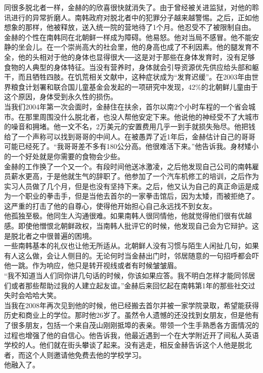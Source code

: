 同很多脱北者一样，金赫的的欣喜很快就消失了。由于曾经被关进监狱，对他的聆讯进行的异常折磨人。南韩政府对脱北者中的犯罪分子越来越警惕。之后，正如他想象的那样，他被释放，送入统一院的营地待了1个月。他忍受不了被限制自由。\\

金赫的个性在南韩同在北朝鲜一样成为障碍。他易怒。他对当局不感冒。他不能安静的坐会儿。在一个崇尚高大的社会里，他的身高也成了不利因素。他的腿发育不全，他的头相对于他的身体也显得很大──这是对于那些在身体发育时，没有足够食物的人典型的身体特征。当没有营养时，身体就会引导资源优先供应给头部和躯干，而且牺牲四肢。在饥荒相关文献中，这种症状成为“发育迟缓”。在2003年由世界粮食计划署和联合国儿童基金会发起的一项研究中发现，42\%的北朝鲜儿童由于这个原因，身体受到永久性的损伤。\\

当我们2004年第一次会面时，金赫住在扶余，首尔以南2个小时车程的一个省会城市。在那里周围没什么脱北者，也没人帮他安定下来。他说他的神经受不了大城市的噪音和拥堵。他一文不名，2万美元的安置费用几乎一到手就损失殆尽。他把钱给了一个声称可以找到哥哥的中间人。在被愚弄了近1年后，金赫估计自己的哥哥可能已经死了。“我哥哥差不多有180公分高。他很难活下来。”他告诉我。身材矮小的一个好处就是你需要的食物会少些。\\

金赫的工作换了一个又一个。有段时间他送冰激凌，之后他发现自己公司的南韩雇员薪水更高，于是他就生气的辞职了。他参加了一个汽车机修工的培训，之后作为实习人员做了几个月，但是也没有坚持下来。之后，他又认为自己的真正命运是成为一个职业的拳击手，但是当他去首尔的一家拳击馆后，因为太矮，而被拒绝了。这严重的打击了他的自尊心，使得他开始担心自己永远找不到女友。\\

他孤独至极。他同生人沟通很难。如果南韩人很同情他，他就觉得他们很有优越感。即使他憎恨北朝鲜政权，当南韩人批评它的时候，他发现自己会为它辩护。这是脱北者之中很普遍的困境。\\

一些南韩基本的礼仪也让他无所适从。北朝鲜人没有习惯与陌生人闲扯几句，如果有人这么做，会让人侧目的。无论何时当金赫出门时，邻居随意的一句招呼都会吓他一跳。作为响应，他只是转开视线或者有时候皱皱眉。\\

“我不知道当人们同你讲几句话的时候，你该如果应答。我不明白怎样才能同邻居们或者那些帮助过我的人建立起友谊。”金赫后来回忆起在南韩第1年的那些社交过失时会哈哈大笑。\\

当我在2008年再次见到他的时候，他已经搬去首尔并被一家学院录取，希望能获得历史和商业上的学位。那时他26岁了。虽然令人遗憾的还没找到女朋友，但是他有了很多朋友，包括一个来自茂山刚刚抵埠的表亲。带领一个生手熟悉各方面情况的过程也增强了他的自信心。他告诉我，他最近遇到一个在大学附近开了间私人英语学校的人。他们就在街头攀谈了起来。没有逃走，相反金赫告诉这个人他是脱北者，而这个人则邀请他免费去他的学校学习。\\

他融入了。\\
